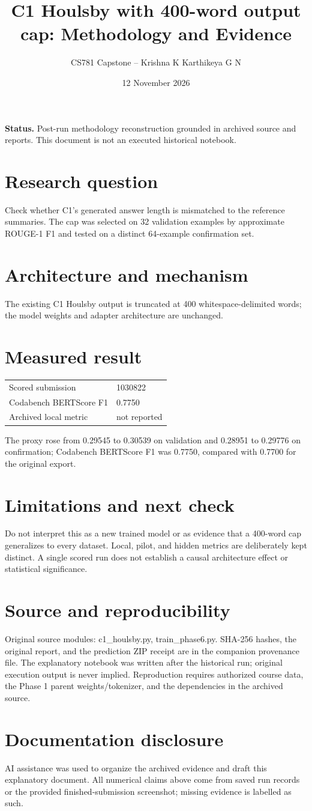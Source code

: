 \documentclass[11pt,a4paper]{article}
\title{C1 Houlsby with 400-word output cap: Methodology and Evidence}
\author{CS781 Capstone -- Krishna K Karthikeya G N}
\date{12 November 2026}
\begin{document}
\maketitle
\noindent\textbf{Status.} Post-run methodology reconstruction grounded in archived source and reports. This document is not an executed historical notebook.\par
\section*{Research question}
Check whether C1's generated answer length is mismatched to the reference summaries. The cap was selected on 32 validation examples by approximate ROUGE-1 F1 and tested on a distinct 64-example confirmation set.
\section*{Architecture and mechanism}
The existing C1 Houlsby output is truncated at 400 whitespace-delimited words; the model weights and adapter architecture are unchanged.
\section*{Measured result}
\begin{center}\begin{tabular}{ll}Scored submission & 1030822\\
Codabench BERTScore F1 & 0.7750\\
Archived local metric & not reported\end{tabular}\end{center}
The proxy rose from 0.29545 to 0.30539 on validation and 0.28951 to 0.29776 on confirmation; Codabench BERTScore F1 was 0.7750, compared with 0.7700 for the original export.
\section*{Limitations and next check}
Do not interpret this as a new trained model or as evidence that a 400-word cap generalizes to every dataset. Local, pilot, and hidden metrics are deliberately kept distinct. A single scored run does not establish a causal architecture effect or statistical significance.
\section*{Source and reproducibility}
Original source modules: c1\_houlsby.py, train\_phase6.py. SHA-256 hashes, the original report, and the prediction ZIP receipt are in the companion provenance file. The explanatory notebook was written after the historical run; original execution output is never implied. Reproduction requires authorized course data, the Phase 1 parent weights/tokenizer, and the dependencies in the archived source.
\section*{Documentation disclosure}
AI assistance was used to organize the archived evidence and draft this explanatory document. All numerical claims above come from saved run records or the provided finished-submission screenshot; missing evidence is labelled as such.
\end{document}
